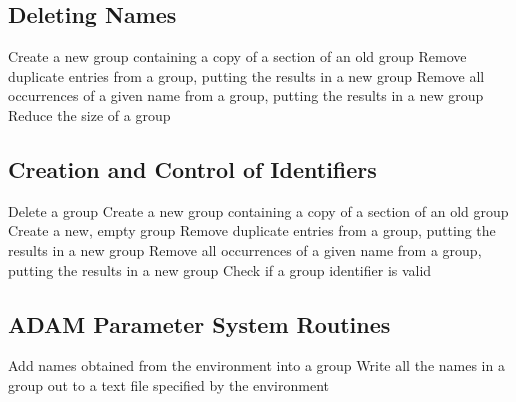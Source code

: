 \subsection{Deleting Names}

            {Create a new group containing a copy of a section of an old group}
            {Remove duplicate entries from a group, putting the results in a new
group}
            {Remove all occurrences of a given name from a group, putting the results in a new group}
            {Reduce the size of a group}


\subsection{Creation and Control of Identifiers}

            {Delete a group}
            {Create a new group containing a copy of a section of an old group}
            {Create a new, empty group}
            {Remove duplicate entries from a group, putting the results in a new
group}
            {Remove all occurrences of a given name from a group, putting the results in a new group}
            {Check if a group identifier is valid}

\subsection{\label{SEC:ADAM}ADAM Parameter System Routines}


            {Add names obtained from the environment into a group}
            {Write all the names in a group out to a text file specified by the
environment}


